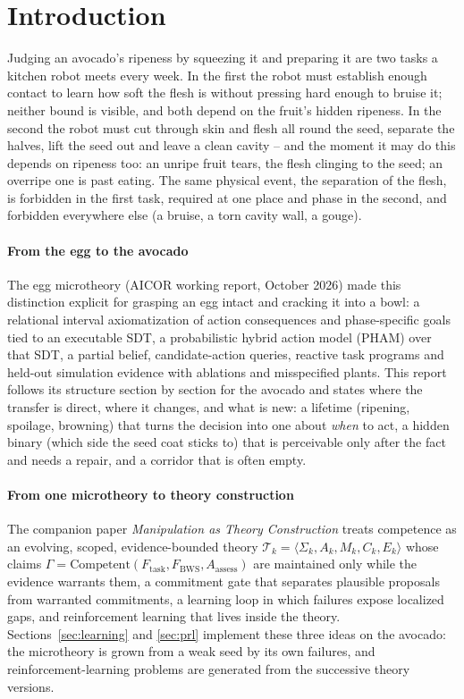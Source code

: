 \documentclass[10.5pt,a4paper]{article}
\begin{document}
\section{Introduction}
Judging an avocado's ripeness by squeezing it and preparing it are two tasks a kitchen robot meets every week. In
the first the robot must establish enough contact to learn how soft the flesh is without pressing hard enough to
bruise it; neither bound is visible, and both depend on the fruit's hidden ripeness. In the second the robot must
cut through skin and flesh all round the seed, separate the halves, lift the seed out and leave a clean cavity -- and
the moment it may do this depends on ripeness too: an unripe fruit tears, the flesh clinging to the seed; an
overripe one is past eating. The same physical event, the separation of the flesh, is forbidden in the first task,
required at one place and phase in the second, and forbidden everywhere else (a bruise, a torn cavity wall, a gouge).

\paragraph{From the egg to the avocado} The egg microtheory (AICOR working report, October 2026) made this
distinction explicit for grasping an egg intact and cracking it into a bowl: a relational interval axiomatization of
action consequences and phase-specific goals tied to an executable SDT, a probabilistic hybrid action model (PHAM)
over that SDT, a partial belief, candidate-action queries, reactive task programs and held-out simulation evidence
with ablations and misspecified plants. This report follows its structure section by section for the avocado and
states where the transfer is direct, where it changes, and what is new: a lifetime (ripening, spoilage, browning)
that turns the decision into one about \emph{when} to act, a hidden binary (which side the seed coat sticks to)
that is perceivable only after the fact and needs a repair, and a corridor that is often empty.

\paragraph{From one microtheory to theory construction} The companion paper \emph{Manipulation as Theory
Construction} treats competence as an evolving, scoped, evidence-bounded theory
$\mathcal{T}_k=\langle\Sigma_k,A_k,M_k,C_k,E_k\rangle$ whose claims $\Gamma=\mathrm{Competent}(F_\text{task},
F_\text{BWS},A_\text{assess})$ are maintained only while the evidence warrants them, a commitment gate that separates
plausible proposals from warranted commitments, a learning loop in which failures expose localized gaps, and
reinforcement learning that lives inside the theory. Sections~\ref{sec:learning} and \ref{sec:prl} implement these
three ideas on the avocado: the microtheory is grown from a weak seed by its own failures, and reinforcement-learning
problems are generated from the successive theory versions.
\end{document}

